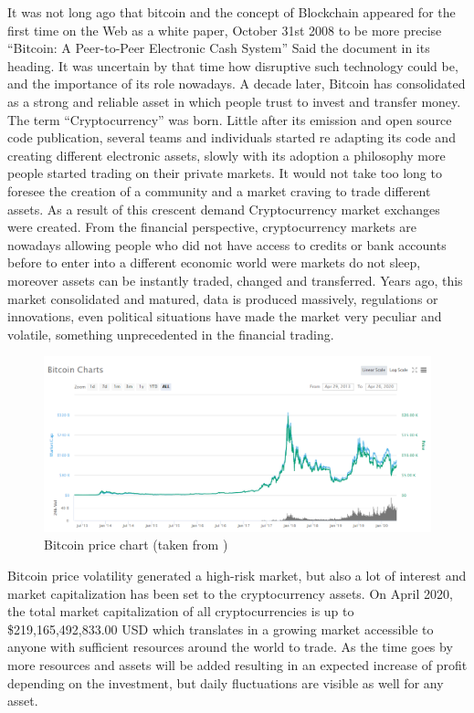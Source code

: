
\noindent
It was not long ago that bitcoin and the concept of Blockchain appeared for the first time on the Web as a white paper, October 31st 2008 to be more precise “Bitcoin: A Peer-to-Peer Electronic Cash System” \cite{nakamoto_bitcoin_2008} Said the document in its heading. It was uncertain by that time how disruptive such technology could be, and the importance of its role nowadays. A decade later, Bitcoin has consolidated as a strong and reliable asset in which people trust to invest and transfer money. The term “Cryptocurrency” was born. Little after its emission and open source code publication, several teams and individuals started re adapting its code and creating different electronic assets, slowly with its adoption a philosophy more people started trading on their private markets. It would not take too long to foresee the creation of a community and a market craving to trade different assets. As a result of this crescent demand Cryptocurrency market exchanges were created. From the financial perspective, cryptocurrency markets are nowadays allowing people who did not have access to credits or bank accounts before to enter into a different economic world were markets do not sleep, moreover assets can be instantly traded, changed and transferred. Years ago, this market consolidated and matured, data is produced massively, regulations or innovations, even political situations have made the market very peculiar and volatile, something unprecedented in the financial trading.

\begin{figure}[ht]
   \centering
   \includegraphics[width=\linewidth]{fig/BitcoinPriceChart.png}
    \caption{Bitcoin price chart (taken from \cite{coinmarketcap_bitcoin_2020})}
    \label{fig:BitcoinChart}
\end{figure}

Bitcoin price volatility generated a high-risk market, but also a lot of interest and market capitalization has been set to the cryptocurrency assets. On April 2020, the total market capitalization of all cryptocurrencies is up to  \$219,165,492,833.00 USD \cite{coinmarketcap_cryptocurrency_2020} which translates in a growing market accessible to anyone with sufficient resources around the world to trade. As the time goes by more resources and assets will be added resulting in an expected increase of profit depending on the investment, but daily fluctuations are visible as well for any asset.

